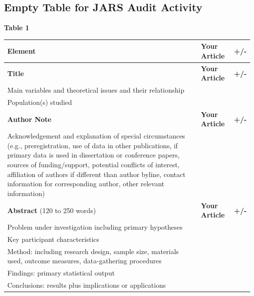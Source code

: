\documentclass[
  11pt,
]{book}
\begin{document}
\subsection{Empty Table for JARS Audit Activity}\label{empty-table-for-jars-audit-activity}

\textbf{Table 1}

\begin{longtable}[]{@{}
  >{\raggedright\arraybackslash}p{}
  >{\raggedright\arraybackslash}p{}
  >{\centering\arraybackslash}p{}@{}}
\toprule\noalign{}
\begin{minipage}[b]{\linewidth}\raggedright
Element
\end{minipage} & \begin{minipage}[b]{\linewidth}\raggedright
Your Article
\end{minipage} & \begin{minipage}[b]{\linewidth}\centering
+/-
\end{minipage} \\
\midrule\noalign{}
\endhead
\bottomrule\noalign{}
\endlastfoot
\textbf{Title} & \textbf{Your Article} & \textbf{+/-} \\
Main variables and theoretical issues and their relationship & & \\
Population(s) studied & & \\
\textbf{Author Note} & \textbf{Your Article} & \textbf{+/-} \\
Acknowledgement and explanation of special circumstances (e.g., preregistration, use of data in other publications, if primary data is used in dissertation or conference papers, sources of funding/support, potential conflicts of interest, affiliation of authors if different than author byline, contact information for corresponding author, other relevant information) & & \\
\textbf{Abstract} (120 to 250 words) & \textbf{Your Article} & \textbf{+/-} \\
Problem under investigation including primary hypotheses & & \\
Key participant characteristics & & \\
Method: including research design, sample size, materials used, outcome measures, data-gathering procedures & & \\
Findings: primary statistical output & & \\
Conclusions: results plus implications or applications & & \\

\end{longtable}
\end{document}
